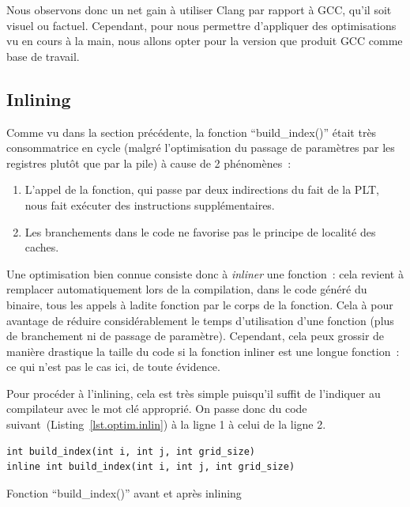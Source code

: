 \documentclass[12pt,a4paper]{article}
\begin{document}
Nous observons donc un net gain à utiliser Clang par rapport à \ac{GCC}, qu'il
soit visuel ou factuel. Cependant, pour nous permettre d’appliquer des
optimisations vu en cours à la main, nous allons opter pour la version que
produit \ac{GCC} comme base de travail.

\subsection{Inlining}
\label{sub.optim.inlin}

Comme vu dans la section précédente, la fonction \enquote{build\_index()} était
très consommatrice en cycle (malgré l’optimisation du passage de paramètres par
les registres plutôt que par la pile) à cause de 2 phénomènes :
\begin{enumerate}
    \item L’appel de la fonction, qui passe par deux indirections du fait de la
        \ac{PLT}, nous fait exécuter des instructions supplémentaires.
    \item Les branchements dans le code ne favorise pas le principe de localité
        des caches.
\end{enumerate}

Une optimisation bien connue consiste donc à \textit{inliner} une fonction :
cela revient à remplacer automatiquement lors de la compilation, dans le code
généré du binaire, tous les appels à ladite fonction par le corps de la
fonction. Cela à pour avantage de réduire considérablement le temps
d’utilisation d’une fonction (plus de branchement ni de passage de paramètre).
Cependant, cela peux grossir de manière drastique la taille du code si la
fonction inliner est une longue fonction : ce qui n’est pas le cas ici, de toute
évidence.

Pour procéder à l’inlining, cela est très simple puisqu’il suffit de l’indiquer
au compilateur avec le mot clé approprié. On passe donc du code
suivant (Listing~\ref{lst.optim.inlin}) à la ligne 1 à celui de la ligne 2.

\begin{listing}[h]
    \begin{verbatim}
int build_index(int i, int j, int grid_size)
inline int build_index(int i, int j, int grid_size)
    \end{verbatim}
    \caption{Fonction \enquote{build\_index()} avant et après inlining}
    \label{lst.optim.inlin}
\end{listing}
\end{document}
